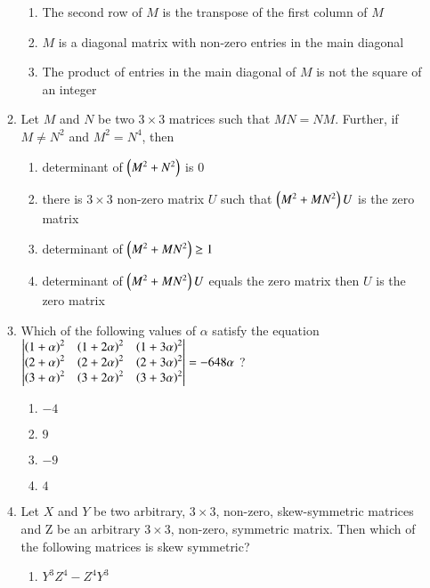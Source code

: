\documentclass[journal,12pt,twocolumn]{IEEEtran}
\theoremstyle{remark}
\begin{document}
\begin{enumerate}
\begin{enumerate}
\begin{enumerate}
							\item The second row of $M$ is the transpose of the first column of $M$
							\item $M$ is a diagonal matrix with non-zero entries in the main diagonal
							\item The product of entries in the main diagonal of $M$ is not the square of an integer
						\end{enumerate}
						\hfill {}
				\item
					Let $M$ and $N$ be two $3 \times 3$ matrices such that $MN=NM$. Further, if $M \neq N^2$ and $M^2 = N^4$, then
						\begin{enumerate}
							\item determinant of $\left(M^2 + N^2\right)$ is 0
							\item there is $3 \times 3$ non-zero matrix $U$ such that $\left(M^2+MN^2\right)U$ is the zero matrix
							\item determinant of $\left(M^2 + MN^2\right) \geq 1$
							\item determinant of $\left(M^2 + MN^2\right)U$ equals the zero matrix then $U$ is the zero matrix
						\end{enumerate}
						\hfill {}
				\item
					Which of the following values of $\alpha$ satisfy the equation
						$\begin{vmatrix}
							\left(1 + \alpha\right)^2 & \left(1 + 2\alpha\right)^2 & \left(1+3\alpha\right)^2\\
							\left(2 + \alpha\right)^2 & \left(2 + 2\alpha\right)^2 & \left(2+3\alpha\right)^2\\
							\left(3 + \alpha\right)^2 & \left(3 + 2\alpha\right)^2 & \left(3+3\alpha\right)^2
						\end{vmatrix} = -648 \alpha $ ?
							\begin{enumerate}
								\item $-4$
								\item $9$
								\item $-9$
								\item $4$
							\end{enumerate}
							\hfill {}
				\item
					Let $X$ and $Y$ be two arbitrary, $3 \times 3$, non-zero, skew-symmetric matrices and Z be an arbitrary $3 \times 3$, non-zero, symmetric matrix. Then which of the following matrices is  skew symmetric?
					\begin{enumerate}
						\item $Y^3Z^4 -Z^4Y^3$

\end{enumerate}
\end{enumerate}
\end{enumerate}
\end{document}
